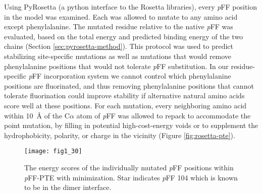 \begin{refsection}
Using PyRosetta (a python interface to the Rosetta
libraries)\cite{Leaver-Fay2011}, every \emph{p}FF position in the model was
examined. Each was allowed to mutate to any amino acid except phenylalanine.
The mutated residue relative to the native \emph{p}FF was evaluated, based on
the total energy and predicted binding energy of the two chains (Section
\ref{sec:pyrosetta-method}). This protocol was used to predict stabilizing
site-specific mutations as well as mutations that would remove phenylalanine
positions that would not tolerate \emph{p}FF substitution. In our
residue-specific \emph{p}FF incorporation system we cannot control which
phenylalanine positions are fluorinated, and thus removing phenylalanine
positions that cannot tolerate fluorination could improve stability if
alternative natural amino acids score well at these positions. For each
mutation, every neighboring amino acid within \SI{10}{\angstrom} of the C$\alpha$
atom of \emph{p}FF was allowed to repack to accommodate the point mutation, by
filling in potential high-cost-energy voids or to supplement the
hydrophobicity, polarity, or charge in the vicinity (Figure
\ref{fig:rosetta-pte}).  
\begin{figure}[h!] \centering \texttt{[image: fig1\_30]}
    \caption[The energy scores of the individually mutated \emph{p}FF positions within
    \emph{p}FF-PTE with minimization. Star indicates pFF 104 which is known to
be in the dimer interface.]{The energy scores of the individually mutated
    \emph{p}FF positions within \emph{p}FF-PTE with minimization. Star
    indicates \emph{p}FF 104 which is known to be in the dimer interface.}
    \label{fig:rosetta-pte-chart} 
\end{figure}


\end{refsection}
